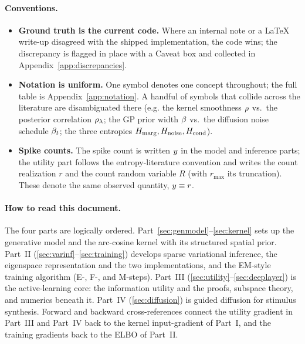 \paragraph{Conventions.}
\begin{itemize}[leftmargin=1.4em,itemsep=1pt,topsep=2pt]
  \item \textbf{Ground truth is the current code.} Where an internal note or a
        LaTeX write-up disagreed with the shipped implementation, the code wins;
        the discrepancy is flagged in place with a \textcolor{red!60!black}{Caveat}
        box and collected in Appendix~\ref{app:discrepancies}.
  \item \textbf{Notation is uniform.} One symbol denotes one concept throughout;
        the full table is Appendix~\ref{app:notation}. A handful of symbols that
        collide across the literature are disambiguated there (e.g. the kernel
        smoothness $\rho$ vs.\ the posterior correlation $\rho_{\lambda}$; the GP prior
        width $\beta$ vs.\ the diffusion noise schedule $\beta_{t}$; the three
        entropies $H_{\mathrm{marg}},H_{\mathrm{noise}},H_{\mathrm{cond}}$).
  \item \textbf{Spike counts.} The spike count is written $y$ in the model and
        inference parts; the utility part follows the entropy-literature
        convention and writes the count realization $r$ and the count random
        variable $R$ (with $r_{\max}$ its truncation). These denote the same
        observed quantity, $y\equiv r$.
\end{itemize}

\paragraph{How to read this document.} The four parts are logically ordered.
Part~\ref{sec:genmodel}--\ref{sec:kernel} sets up the generative model and the
arc-cosine kernel with its structured spatial prior. Part~II
(\ref{sec:varinf}--\ref{sec:training}) develops sparse variational inference, the
eigenspace representation and the two implementations, and the EM-style training
algorithm (E-, F-, and M-steps). Part~III
(\ref{sec:utility}--\ref{sec:deeplayer}) is the active-learning core: the
information utility and the proofs, subspace theory, and numerics beneath it.
Part~IV (\ref{sec:diffusion}) is guided diffusion for stimulus synthesis. Forward
and backward cross-references connect the utility gradient in Part~III and
Part~IV back to the kernel input-gradient of Part~I, and the training gradients
back to the ELBO of Part~II.
